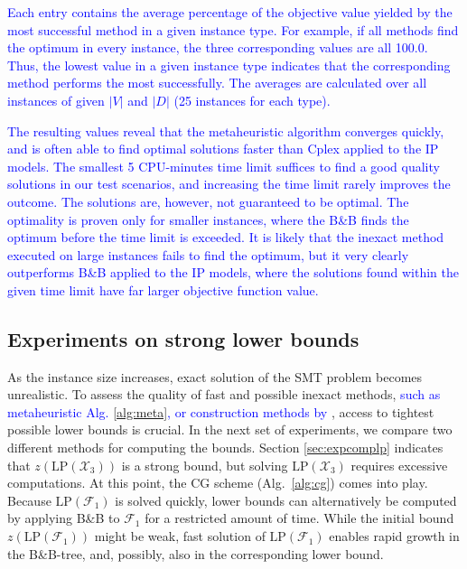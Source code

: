 \textcolor{blue}{
Each entry contains the average percentage  of the objective value yielded by the most successful method in a given instance type.
For example, if all methods find the optimum in every instance, the three corresponding values are all 100.0.
Thus, the lowest value in a given instance type indicates that the corresponding method performs the most successfully. 
The averages are calculated over all instances of given $|V|$ and $|D|$ (25 instances for each type).
}

\textcolor{blue}{
The resulting values reveal that the metaheuristic algorithm converges quickly, and is often able to find optimal solutions faster than Cplex applied to the IP models.
The smallest 5 CPU-minutes time limit suffices to find a good quality solutions in our test scenarios, and increasing the time limit rarely improves the outcome.
The solutions are, however, not guaranteed to be optimal.
The optimality is proven only for smaller instances, where the B\&B finds the optimum before the time limit is exceeded.
It is likely that the inexact method executed on large instances fails to find the optimum, but it very clearly outperforms B\&B applied to the IP models, 
where the solutions found within the given time limit have far larger objective function value.
}
\newline

\subsection{Experiments on strong lower bounds}

As the instance size increases, exact solution of the SMT problem becomes unrealistic.
To assess the quality of fast and possible inexact methods, \textcolor{blue}{such as metaheuristic Alg. \ref{alg:meta}, 
or construction methods by \citep{ivanova16isco}},  access to tightest possible lower bounds is crucial.
In the next set of experiments, we compare two different methods for computing the bounds.
Section \ref{sec:expcomplp} indicates that $z\left(\text{LP}(\mathcal{X}_3)\right)$ is a strong bound,
but solving $\text{LP}(\mathcal{X}_3)$ requires excessive computations.
At this point, the CG scheme (Alg.\ \ref{alg:cg}) comes into play.
Because $\text{LP}(\mathcal{F}_1)$ is solved quickly, lower bounds can alternatively be computed 
by applying B\&B to $\mathcal{F}_1$ for a restricted amount of time.
While the initial bound $z\left(\text{LP}(\mathcal{F}_1)\right)$ might be weak, fast solution of $\text{LP}(\mathcal{F}_1)$ enables rapid growth in the B\&B-tree,
and, possibly, also in the corresponding lower bound.

